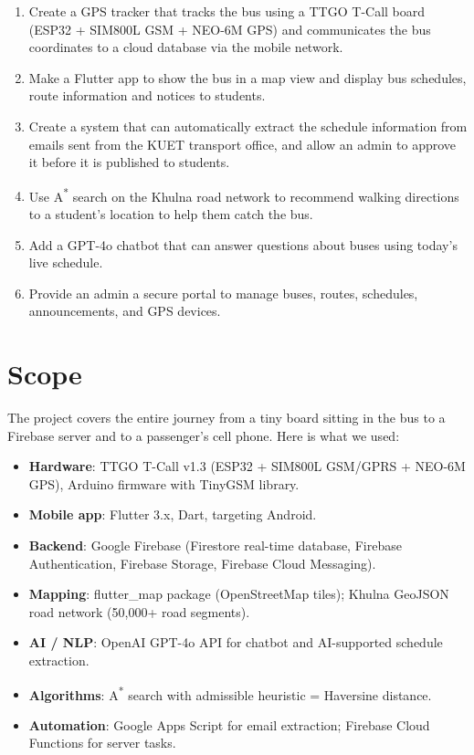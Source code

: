 \documentclass[12pt,a4paper]{report}
\begin{document}
\begin{enumerate}[leftmargin=*, label=\arabic*.]
  \item Create a GPS tracker that tracks the bus using a TTGO T-Call board (ESP32 + SIM800L GSM + NEO-6M GPS) and communicates the bus coordinates to a cloud database via the mobile network.
  \item Make a Flutter app to show the bus in a map view and display bus schedules, route information and notices to students.
  \item Create a system that can automatically extract the schedule information from emails sent from the KUET transport office, and allow an admin to approve it before it is published to students.
  \item Use A\textsuperscript{*} search on the Khulna road network to recommend walking directions to a student's location to help them catch the bus.
  \item Add a GPT-4o chatbot that can answer questions about buses using today's live schedule.
  \item Provide an admin a secure portal to manage buses, routes, schedules, announcements, and GPS devices.
\end{enumerate}

\section{Scope}

The project covers the entire journey from a tiny board sitting in the bus to a Firebase server and to a passenger's cell phone. Here is what we used:

\begin{itemize}[leftmargin=*]
  \item \textbf{Hardware}: TTGO T-Call v1.3 (ESP32 + SIM800L GSM/GPRS + NEO-6M GPS), Arduino firmware with TinyGSM library.
  \item \textbf{Mobile app}: Flutter 3.x, Dart, targeting Android.
  \item \textbf{Backend}: Google Firebase (Firestore real-time database, Firebase Authentication, Firebase Storage, Firebase Cloud Messaging).
  \item \textbf{Mapping}: flutter\_map package (OpenStreetMap tiles); Khulna GeoJSON road network (50,000+ road segments).
  \item \textbf{AI / NLP}: OpenAI GPT-4o API for chatbot and AI-supported schedule extraction.
  \item \textbf{Algorithms}: A\textsuperscript{*} search with admissible heuristic = Haversine distance.
  \item \textbf{Automation}: Google Apps Script for email extraction; Firebase Cloud Functions for server tasks.
\end{itemize}
\end{document}
